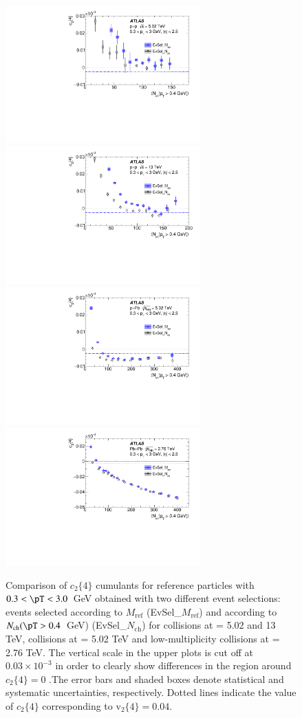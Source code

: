 \documentclass[cernpreprint,texlive=2014,txfonts,UKenglish]{latex/atlasdoc}
\begin{document}
\begin{figure}[ht!]
\begin{center}
\includegraphics[width=75mm]{fig_03a.pdf}
\includegraphics[width=75mm]{fig_03b.pdf}
\includegraphics[width=75mm]{fig_03c.pdf}
\includegraphics[width=75mm]{fig_03d.pdf}
\caption{Comparison of $c_2\{4\}$ cumulants for reference particles with $0.3< \pT < 3.0$~GeV obtained with two different event selections: events selected according to $M_{\mathrm{ref}}$ (EvSel\_$M_{\mathrm{ref}}$) and according to $N_{\mathrm{ch}}(\pT > 0.4$~GeV) (EvSel\_$N_{\mathrm{ch}}$) for \pp collisions at \sqs= 5.02 and 13 TeV, \pPb collisions at \sqn= 5.02 TeV and low-multiplicity \PbPb collisions at \sqn= 2.76 TeV.  The vertical scale in the upper plots is cut off at $0.03 \times 10^{-3}$ in order to clearly show differences in the region around $c_2\{4\} = 0$ .The error bars  and shaded boxes denote statistical and systematic uncertainties, respectively. Dotted lines indicate the value of $c_2\{4\}$ corresponding to $\mathrm{v}_2\{4\}= 0.04$. }
\label{fig:multFluct} 
\end{center}
\end{figure} 
\end{document}

